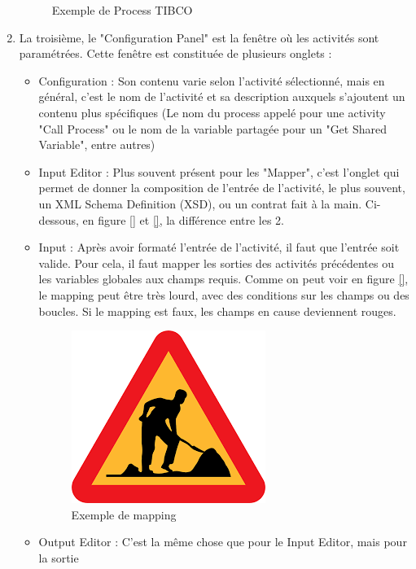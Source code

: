 \begin{enumerate}
\begin{figure}[h!]
		\caption{Exemple de Process TIBCO}
		\label{fig:encours3}
	\end{figure}
\item La troisième, le "Configuration Panel" est la fenêtre où les activités sont paramétrées.
Cette fenêtre est constituée de plusieurs onglets :
\begin{itemize}
	\item  Configuration : Son contenu varie selon l'activité sélectionné, mais en général, c'est
	le nom de l'activité et sa description auxquels s'ajoutent un contenu plus spécifiques
	(Le nom du process appelé pour une activity "Call Process" ou le nom de la variable
	partagée pour un "Get Shared Variable", entre autres)
	\item Input Editor : Plus souvent présent pour les "Mapper", c'est l'onglet qui permet
	de donner la composition de l'entrée de l'activité, le plus souvent, un XML Schema
	Definition (XSD), ou un contrat fait à la main. Ci-dessous, en figure \ref{} et \ref{}, la
	différence entre les 2.
	\item Input : Après avoir formaté l'entrée de l'activité, il faut que l'entrée soit valide. Pour
	cela, il faut mapper les sorties des activités précédentes ou les variables globales aux
	champs requis. Comme on peut voir en figure \ref{}, le mapping peut être très lourd,
	avec des conditions sur les champs ou des boucles. Si le mapping est faux, les champs
	en cause deviennent rouges.
	\begin{figure}[h!]
		\centering
		\includegraphics[width=0.7\linewidth]{img/encours}
		\caption{Exemple de mapping}
		\label{fig:encours4}
	\end{figure}
	\item Output Editor : C'est la même chose que pour le Input Editor, mais pour la sortie

\end{itemize}
\end{enumerate}
